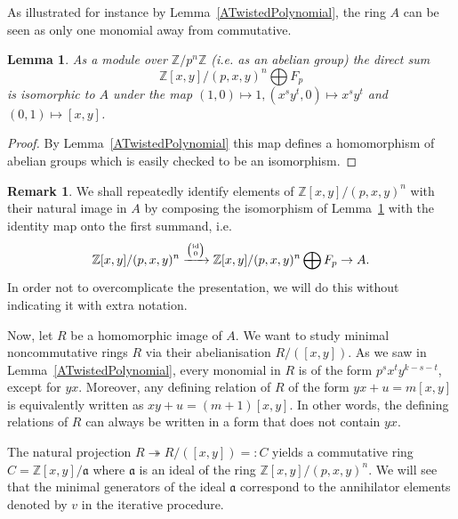 \documentclass[11pt]{article}
\DeclareMathOperator{\id}{id}
\newtheorem{lemma}[corollary]{Lemma}
\theoremstyle{definition}
\newtheorem{remark}[corollary]{Remark}
\begin{document}
As illustrated for instance by Lemma~\ref{ATwistedPolynomial}, the ring $A$ can be seen as only one monomial away from commutative.

\begin{lemma}\label{AModuleIsomorphism}
As a module over $\mathbb{Z}/p^n\mathbb{Z}$ (i.e. as an abelian group) the direct sum
\[\mathbb{Z}[x,y]/(p,x,y)^n\bigoplus F_p\]
is isomorphic to $A$ under the map $(1,0)\mapsto 1, (x^sy^t,0)\mapsto x^sy^t$ and $(0,1)\mapsto [x,y]$.
\end{lemma}

\begin{proof}
By Lemma~\ref{ATwistedPolynomial} this map defines a homomorphism of abelian groups which is easily checked to be an isomorphism.
\end{proof}

\begin{remark}\label{Identification}
We shall repeatedly identify elements of $\mathbb{Z}[x,y]/(p,x,y)^n$ with their natural image in $A$ by composing the isomorphism of Lemma~\ref{AModuleIsomorphism} with the identity map onto the first summand, i.e.
\[\mathbb{Z}[x,y]/(p,x,y)^n\xrightarrow{\text{\tiny{\(\begin{pmatrix}
\id\\
0
\end{pmatrix}\)}}}
\mathbb{Z}[x,y]/(p,x,y)^n\bigoplus F_p\to A.\]
In order not to overcomplicate the presentation, we will do this without indicating it with extra notation.
\end{remark}

Now, let $R$ be a homomorphic image of $A$. We want to study minimal noncommutative rings $R$ via their abelianisation $R/([x,y])$. As we saw in Lemma~\ref{ATwistedPolynomial}, every monomial in $R$ is of the form $p^sx^ty^{k-s-t}$, except for $yx$. Moreover, any defining relation of $R$ of the form $yx+u=m[x,y]$ is equivalently written as $xy+u=(m+1)[x,y]$. In other words, the defining relations of $R$ can always be written in a form that does not contain $yx$.

The natural projection $R\twoheadrightarrow R/([x,y])=:C$ yields a commutative ring $C=\mathbb{Z}[x,y]/\mathfrak{a}$ where $\mathfrak{a}$ is an ideal of the ring $\mathbb{Z}[x,y]/(p,x,y)^n$. We will see that the minimal generators of the ideal $\mathfrak{a}$ correspond to the annihilator elements denoted by $v$ in the iterative procedure.
\end{document}
